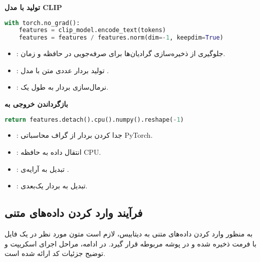 \documentclass{article}
\begin{document}
\textbf{تولید  با مدل CLIP}

\begin{latin}
\begin{lstlisting}[language=Python]
with torch.no_grad():
    features = clip_model.encode_text(tokens)
    features = features / features.norm(dim=-1, keepdim=True)
\end{lstlisting}
\end{latin}

\begin{itemize}
    \item {}: جلوگیری از ذخیره‌سازی گرادیان‌ها برای صرفه‌جویی در حافظه و زمان.  
    \item {}: تولید بردار عددی متن  با مدل .  
    \item {}: نرمال‌سازی بردار به طول یک.  
\end{itemize}

\textbf{بازگرداندن خروجی به }

\begin{latin}
\begin{lstlisting}[language=Python]
return features.detach().cpu().numpy().reshape(-1)
\end{lstlisting}
\end{latin}

\begin{itemize}
    \item {}: جدا کردن بردار از گراف محاسباتی PyTorch.  
    \item {}: انتقال داده به حافظه CPU.  
    \item {}: تبدیل به آرایه‌ی .  
    \item {}: تبدیل به بردار یک‌بعدی.  
\end{itemize}





\subsection{فرآیند وارد کردن داده‌های متنی}

به منظور وارد کردن داده‌های متنی به دیتابیس، لازم است متون مورد نظر در یک فایل با فرمت  ذخیره شده و در پوشه مربوطه قرار گیرد. در ادامه، مراحل اجرای اسکریپت و توضیح جزئیات کد ارائه شده است.
\end{document}
